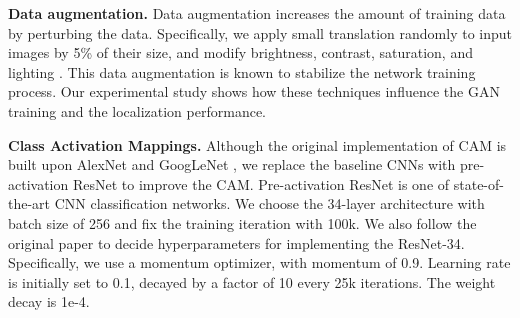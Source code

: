\documentclass[runningheads]{llncs}
\begin{document}
\noindent\textbf{Data augmentation.} Data augmentation increases the amount of training data by perturbing the data. Specifically, we apply small translation randomly to input images by 5\% of their size, and modify brightness, contrast, saturation, and lighting \cite{krizhevsky2012imagenet}. This data augmentation is known to stabilize the network training process. Our experimental study shows how these techniques influence the GAN training and the localization performance.

\noindent\textbf{Class Activation Mappings.} Although the original implementation of CAM is built upon AlexNet \cite{krizhevsky2012imagenet} and GoogLeNet \cite{szegedy2015going}, we replace the baseline CNNs with pre-activation ResNet \cite{he2016identity} to improve the CAM. Pre-activation ResNet is one of state-of-the-art CNN classification networks. We choose the 34-layer architecture with batch size of 256 and fix the training iteration with 100k. We also follow the original paper \cite{he2016identity} to decide hyperparameters for implementing the ResNet-34. Specifically, we use a momentum optimizer, with momentum of 0.9. Learning rate is initially set to 0.1, decayed by a factor of 10 every 25k iterations. The weight decay is 1e-4. 
\end{document}
